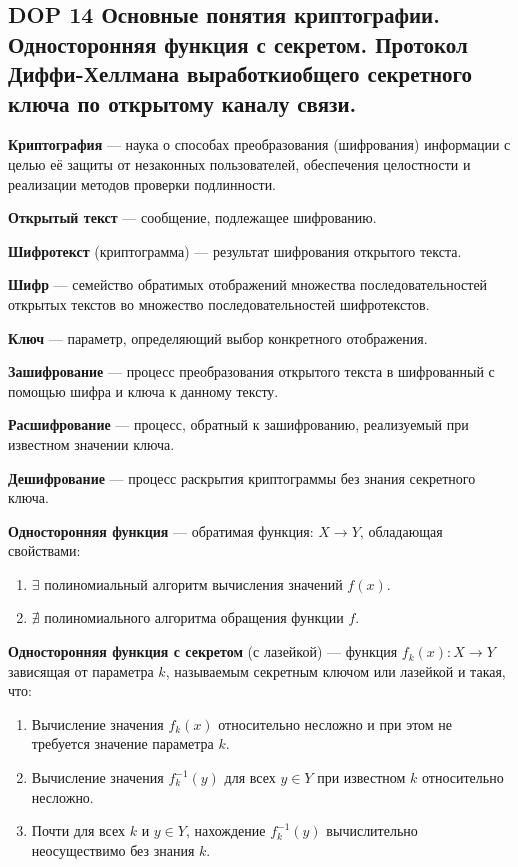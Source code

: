 \subsection{DOP 14 Основные  понятия  криптографии.  Односторонняя  функция  с  секретом.  Протокол  Диффи-Хеллмана выработкиобщего секретного ключа по открытому каналу связи.}

\textbf{Криптография} --- наука о способах преобразования (шифрования) информации с целью её защиты от незаконных пользователей, обеспечения целостности и реализации методов проверки подлинности.

\textbf{Открытый текст} --- сообщение, подлежащее шифрованию.

\textbf{Шифротекст} (криптограмма) --- результат шифрования открытого текста.

\textbf{Шифр} --- семейство обратимых отображений множества последовательностей открытых текстов во множество последовательностей шифротекстов.

\textbf{Ключ} --- параметр, определяющий выбор конкретного отображения.

\textbf{Зашифрование} --- процесс преобразования открытого текста в шифрованный с помощью шифра и ключа к данному тексту.

\textbf{Расшифрование} --- процесс, обратный к зашифрованию, реализуемый при известном значении ключа.

\textbf{Дешифрование} --- процесс раскрытия криптограммы без знания секретного ключа.

\textbf{Односторонняя функция} --- обратимая функция: $X \rightarrow Y$, обладающая свойствами:
\begin{enumerate}
    \item $\exists$ полиномиальный алгоритм вычисления значений $f(x)$.
    \item $\nexists$ полиномиального алгоритма обращения функции $f$.
\end{enumerate}

\textbf{Односторонняя функция с секретом} (с лазейкой) — функция $f_k(x): X \rightarrow Y$ зависящая от параметра $k$, называемым секретным ключом или лазейкой и такая, что:
\begin{enumerate}
    \item Вычисление значения $f_k(x)$ относительно несложно и при этом не требуется значение параметра $k$.
    \item Вычисление значения $f^{-1}_k(y)$ для всех $y \in Y$ при известном $k$ относительно несложно.
    \item Почти для всех $k$ и $y \in Y$, нахождение $f^{-1}_k(y)$ вычислительно неосуществимо без знания $k$.
\end{enumerate}


